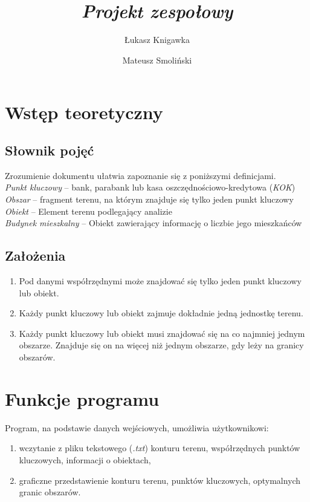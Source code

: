 \documentclass[a4paper,12pt]{article}
\title{ \sc{Specyfikacja funkcjonalna} \\
\emph{Projekt zespołowy} }
\author{Łukasz Knigawka \and Mateusz Smoliński}
\newcommand\tab[1][0.6cm]{\hspace*{#1} }
\begin{document}
\maketitle

\thispagestyle{empty}

\tableofcontents

\newpage

\section{Wstęp teoretyczny}

\subsection{Słownik pojęć}

\tab Zrozumienie dokumentu ułatwia zapoznanie się z poniższymi definicjami.
\\\textit{Punkt kluczowy} -- bank, parabank lub kasa oszczędnościowo-kredytowa (\textit{KOK})
\\\textit{Obszar} -- fragment terenu, na którym znajduje się tylko jeden punkt kluczowy
\\\textit{Obiekt} -- Element terenu podlegający analizie
\\\textit{Budynek mieszkalny} -- Obiekt zawierający informację o liczbie jego mieszkańców

\subsection{Założenia}

\begin{enumerate}
\item Pod danymi współrzędnymi może znajdować się tylko jeden punkt kluczowy lub obiekt. 
\item Każdy punkt kluczowy lub obiekt zajmuje dokładnie jedną jednostkę terenu. 
\item Każdy punkt kluczowy lub obiekt musi znajdować się na co najmniej jednym obszarze. Znajduje się on na więcej niż jednym obszarze, gdy leży na granicy obszarów.
\end{enumerate}

\section{Funkcje programu}

\tab Program, na podstawie danych wejściowych, umożliwia użytkownikowi:
\begin{enumerate}
\item wczytanie z pliku tekstowego (\textit{.txt}) konturu terenu, współrzędnych punktów kluczowych, informacji o obiektach,
\item graficzne przedstawienie konturu terenu, punktów kluczowych, optymalnych granic obszarów.
\end{enumerate}
\end{document}
